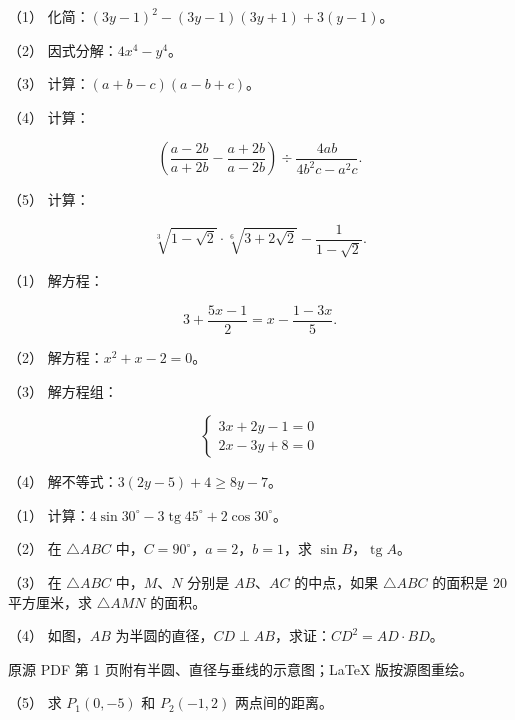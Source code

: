 \begin{question}

（1） 化简：$(3y-1)^2-(3y-1)(3y+1)+3(y-1)$。

（2） 因式分解：$4x^4-y^4$。

（3） 计算：$(a+b-c)(a-b+c)$。

（4） 计算：

\nopagebreak[4]
\[
\left(\frac{a-2b}{a+2b}-\frac{a+2b}{a-2b}\right)\div\frac{4ab}{4b^2c-a^2c}.
\]

（5） 计算：

\nopagebreak[4]
\[
\sqrt[3]{1-\sqrt2}\cdot\sqrt[6]{3+2\sqrt2}-\frac1{1-\sqrt2}.
\]

\end{question}
\begin{question}

（1） 解方程：

\nopagebreak[4]
\[
3+\frac{5x-1}{2}=x-\frac{1-3x}{5}.
\]

（2） 解方程：$x^2+x-2=0$。

（3） 解方程组：

\nopagebreak[4]
\[
\begin{cases}
3x+2y-1=0\\
2x-3y+8=0
\end{cases}
\]

（4） 解不等式：$3(2y-5)+4\geqslant8y-7$。

\Needspace{0.4\textheight}
\end{question}
\begin{question}

（1） 计算：$4\sin30^\circ-3\operatorname{tg}45^\circ+2\cos30^\circ$。

（2） 在 $\triangle ABC$ 中，$C=90^\circ$，$a=2$，$b=1$，求 $\sin B$，$\operatorname{tg}A$。

（3） 在 $\triangle ABC$ 中，$M\text{、}N$ 分别是 $AB\text{、}AC$ 的中点，如果 $\triangle ABC$ 的面积是 $20$ 平方厘米，求 $\triangle AMN$ 的面积。

（4） 如图，$AB$ 为半圆的直径，$CD\perp AB$，求证：$CD^2=AD\cdot BD$。

\begin{gktip}
原源 PDF 第 1 页附有半圆、直径与垂线的示意图；LaTeX 版按源图重绘。
\end{gktip}
\nopagebreak[4]
\begin{center}\end{center}
\nopagebreak[4]
（5） 求 $P_1(0,-5)$ 和 $P_2(-1,2)$ 两点间的距离。

\end{question}
